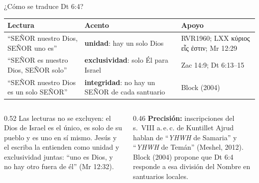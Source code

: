 \documentclass[hyperref={bookmarks=false},aspectratio=169]{beamer}
\newcommand{\grc}[1]{\foreignlanguage{ancientgreek}{#1}}
\newcommand{\SENOR}{S{\fontsize{0.78em}{1em}\selectfont EÑOR}}
\newcommand{\destacar}[1]{\textbf{\textcolor{azul}{#1}}}
\newcommand{\precision}[1]{{\footnotesize\color{gris}\textbf{Precisión:} #1}}
\begin{document}
\begin{frame}{¿Cómo se traduce Dt 6:4?}
\scriptsize\renewcommand{\arraystretch}{1.2}
\begin{tabular}{@{}>{\RaggedRight\arraybackslash}p{4.6cm}>{\RaggedRight\arraybackslash}p{3.6cm}>{\RaggedRight\arraybackslash}p{3.6cm}@{}}
\toprule
\textbf{Lectura} & \textbf{Acento} & \textbf{Apoyo} \\ \midrule
``\SENOR{} nuestro Dios, \SENOR{} uno es'' & \destacar{unidad}: hay un solo Dios & RVR1960; LXX \grc{κύριος εἷς ἐστιν}; Mr 12:29 \\
``\SENOR{} es nuestro Dios, \SENOR{} solo'' & \destacar{exclusividad}: solo Él para Israel & Zac 14:9; Dt 6:13--15 \\
``\SENOR{} nuestro Dios es un solo \SENOR'' & \destacar{integridad}: no hay un \SENOR{} de cada santuario & Block (2004) \\
\bottomrule
\end{tabular}\par\medskip
\begin{columns}[t,onlytextwidth]
\begin{column}{0.52\textwidth}\small
Las lecturas no se excluyen: el Dios de Israel es el único, es solo de su pueblo y es uno en sí mismo. Jesús y el escriba la entienden como unidad y exclusividad juntas: ``uno es Dios, y no hay otro fuera de él'' (Mr 12:32).
\end{column}
\begin{column}{0.46\textwidth}
\precision{inscripciones del s.~VIII a.\,e.\,c. de Kuntillet Ajrud hablan de ``\emph{YHWH} de Samaria'' y ``\emph{YHWH} de Temán'' (Meshel, 2012). Block (2004) propone que Dt 6:4 responde a esa división del Nombre en santuarios locales.}
\end{column}
\end{columns}
\end{frame}
\end{document}
